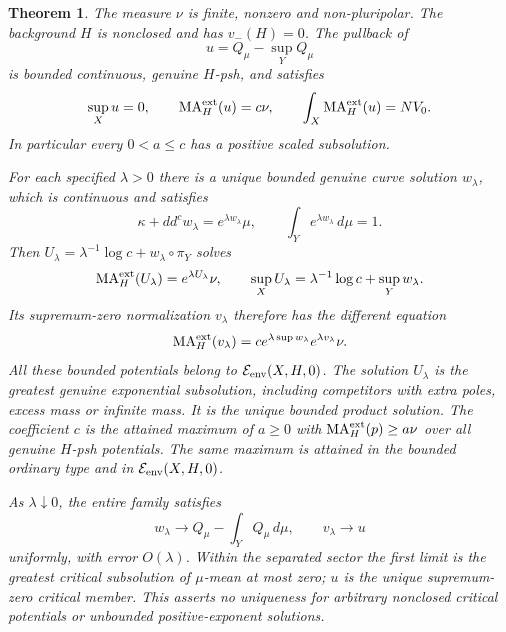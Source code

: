 \documentclass[11pt]{article}
\newcommand{\ddc}{dd^c}
\newcommand{\MA}{\operatorname{MA}}
\newcommand{\Eenv}{\mathcal E_{\rm env}}
\newtheorem{theorem}{Theorem}
\theoremstyle{remark}\newtheorem{remark}[theorem]{Remark}
\begin{document}
\begin{theorem}\label{thm:main}
The measure $\nu$ is finite, nonzero and non-pluripolar. The background
$H$ is nonclosed and has $v_-(H)=0$. The pullback of
\[
 u=Q_\mu-\sup_YQ_\mu
\]
is bounded continuous, genuine $H$-psh, and satisfies
\[
 \sup_Xu=0,\qquad \MA_H^{\rm ext}(u)=c\nu,\qquad
 \int_X\MA_H^{\rm ext}(u)=NV_0.
\]
In particular every $0<a\leq c$ has a positive scaled subsolution.

For each specified $\lambda>0$ there is a unique bounded genuine curve
solution $w_\lambda$, which is continuous and satisfies
\[
 \kappa+\ddc w_\lambda=e^{\lambda w_\lambda}\mu,\qquad
 \int_Ye^{\lambda w_\lambda}\,d\mu=1.
\]
Then $U_\lambda=\lambda^{-1}\log c+w_\lambda\circ\pi_Y$ solves
\[
 \MA_H^{\rm ext}(U_\lambda)=e^{\lambda U_\lambda}\nu,\qquad
 \sup_XU_\lambda=\lambda^{-1}\log c+\sup_Yw_\lambda.
\]
Its supremum-zero normalization $v_\lambda$ therefore has the different
equation
\[
 \MA_H^{\rm ext}(v_\lambda)
   =c e^{\lambda\sup w_\lambda}e^{\lambda v_\lambda}\nu.
\]
All these bounded potentials belong to $\Eenv(X,H,0)$.
The solution $U_\lambda$ is the greatest genuine exponential subsolution,
including competitors with extra poles, excess mass or infinite mass.
It is the unique bounded product solution. The coefficient $c$ is the
attained maximum of $a\geq0$ with $\MA_H^{\rm ext}(p)\geq a\nu$ over
all genuine $H$-psh potentials. The same maximum is attained in the bounded
ordinary type and in $\Eenv(X,H,0)$.

As $\lambda\downarrow0$, the entire family satisfies
\[
 w_\lambda\longrightarrow Q_\mu-\int_YQ_\mu\,d\mu,
 \qquad v_\lambda\longrightarrow u
\]
uniformly, with error $O(\lambda)$. Within the separated sector the
first limit is the greatest critical subsolution of $\mu$-mean at most
zero; $u$ is the unique supremum-zero critical member. This asserts no
uniqueness for arbitrary nonclosed critical potentials or unbounded
positive-exponent solutions.
\end{theorem}
\end{document}
